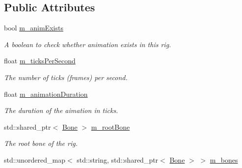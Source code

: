 \subsection*{Public Attributes}
\begin{DoxyCompactItemize}
\item 
bool \hyperlink{classRig_a42b95662302d17e8ab047ea080322031}{m\+\_\+anim\+Exists}\hypertarget{classRig_a42b95662302d17e8ab047ea080322031}{}\label{classRig_a42b95662302d17e8ab047ea080322031}

\begin{DoxyCompactList}\small\item\em A boolean to check whether animation exists in this rig. \end{DoxyCompactList}\item 
float \hyperlink{classRig_a8373e42ca0a664328a934337b696b488}{m\+\_\+ticks\+Per\+Second}\hypertarget{classRig_a8373e42ca0a664328a934337b696b488}{}\label{classRig_a8373e42ca0a664328a934337b696b488}

\begin{DoxyCompactList}\small\item\em The number of ticks (frames) per second. \end{DoxyCompactList}\item 
float \hyperlink{classRig_a88fdee096d1a8288ddae1501218589e0}{m\+\_\+animation\+Duration}\hypertarget{classRig_a88fdee096d1a8288ddae1501218589e0}{}\label{classRig_a88fdee096d1a8288ddae1501218589e0}

\begin{DoxyCompactList}\small\item\em The duration of the aimation in ticks. \end{DoxyCompactList}\item 
std\+::shared\+\_\+ptr$<$ \hyperlink{classBone}{Bone} $>$ \hyperlink{classRig_a024e1df72177a5526f5bffcf48490205}{m\+\_\+root\+Bone}\hypertarget{classRig_a024e1df72177a5526f5bffcf48490205}{}\label{classRig_a024e1df72177a5526f5bffcf48490205}

\begin{DoxyCompactList}\small\item\em The root bone of the rig. \end{DoxyCompactList}\item 
std\+::unordered\+\_\+map$<$ std\+::string, std\+::shared\+\_\+ptr$<$ \hyperlink{classBone}{Bone} $>$ $>$ \hyperlink{classRig_a5be73cd6723167c92dd1d4fd1fc574cc}{m\+\_\+bones}\hypertarget{classRig_a5be73cd6723167c92dd1d4fd1fc574cc}{}\label{classRig_a5be73cd6723167c92dd1d4fd1fc574cc}


\end{DoxyCompactItemize}
